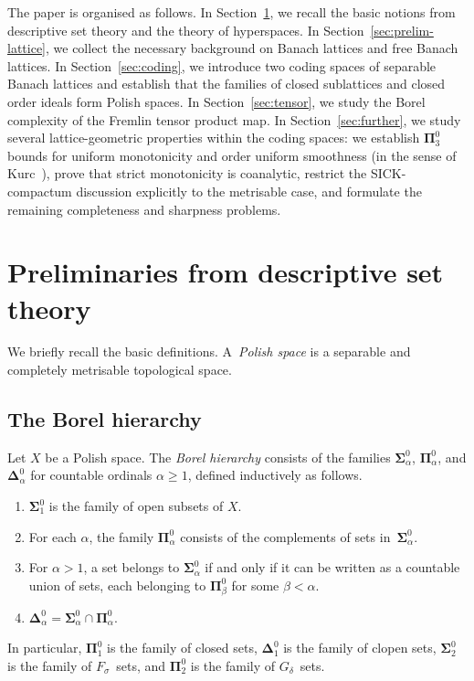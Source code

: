 \documentclass[12pt]{amsart}
\renewcommand{\ge}{\geqslant}
\theoremstyle{plain}
\theoremstyle{definition}
\theoremstyle{remark}
\begin{document}
The paper is organised as follows.
In Section~\ref{sec:prelim-dst}, we recall the basic notions from descriptive
set theory and the theory of hyperspaces.
In Section~\ref{sec:prelim-lattice}, we collect the necessary background on
Banach lattices and free Banach lattices.
In Section~\ref{sec:coding}, we introduce two coding spaces of separable Banach
lattices and establish that the families of closed sublattices and closed order
ideals form Polish spaces.
In Section~\ref{sec:tensor}, we study the Borel complexity of the Fremlin tensor
product map.
In Section~\ref{sec:further}, we study several lattice-geometric properties
within the coding spaces: we establish $\boldsymbol{\Pi}^0_3$ bounds for uniform
monotonicity and order uniform smoothness (in the sense of
Kurc~\cite{Kurc1993Dual}), prove that strict monotonicity is coanalytic, restrict
the SICK-compactum discussion explicitly to the metrisable case, and formulate
the remaining completeness and sharpness problems.

\section{Preliminaries from descriptive set theory}\label{sec:prelim-dst}

We briefly recall the basic definitions.  A~\emph{Polish space} is a separable
and completely metrisable topological space.

\subsection{The Borel hierarchy}

Let $X$ be a Polish space.  The \emph{Borel hierarchy} consists of the families
$\boldsymbol{\Sigma}^0_\alpha$, $\boldsymbol{\Pi}^0_\alpha$, and
$\boldsymbol{\Delta}^0_\alpha$ for countable ordinals $\alpha \ge 1$,
defined inductively as follows.
\begin{enumerate}[label=(\roman*)]
    \item $\boldsymbol{\Sigma}^0_1$ is the family of open subsets of $X$.
    \item For each $\alpha$, the family $\boldsymbol{\Pi}^0_\alpha$ consists of
      the complements of sets in~$\boldsymbol{\Sigma}^0_\alpha$.
    \item For $\alpha > 1$, a set belongs to $\boldsymbol{\Sigma}^0_\alpha$ if
      and only if it can be written as a countable union of sets, each belonging
      to $\boldsymbol{\Pi}^0_\beta$ for some $\beta < \alpha$.
    \item $\boldsymbol{\Delta}^0_\alpha = \boldsymbol{\Sigma}^0_\alpha \cap
      \boldsymbol{\Pi}^0_\alpha$.
\end{enumerate}
In particular, $\boldsymbol{\Pi}^0_1$ is the family of closed sets,
$\boldsymbol{\Delta}^0_1$ is the family of clopen sets,
$\boldsymbol{\Sigma}^0_2$ is the family of $F_\sigma$~sets, and
$\boldsymbol{\Pi}^0_2$ is the family of $G_\delta$~sets.
\end{document}
